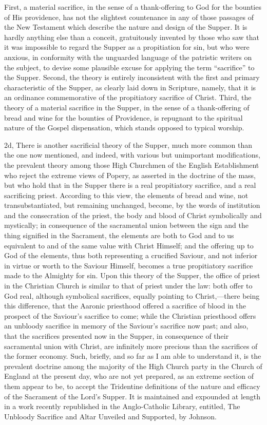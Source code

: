 \documentclass[]{book}
\begin{document}
First, a material sacrifice, in the sense of a thank-offering to God for the bounties of His providence, has not the slightest countenance in any of those passages of the New Testament which describe the nature and design of the Supper. It is hardly anything else than a conceit, gratuitously invented by those who saw that it was impossible to regard the Supper as a propitiation for sin, but who were anxious, in conformity with the unguarded language of the patristic writers on the subject, to devise some plausible excuse for applying the term ``sacrifice'' to the Supper. Second, the theory is entirely inconsistent with the first and primary characteristic of the Supper, as clearly laid down in Scripture, namely, that it is an ordinance commemorative of the propitiatory sacrifice of Christ. Third, the theory of a material sacrifice in the Supper, in the sense of a thank-offering of bread and wine for the bounties of Providence, is repugnant to the spiritual nature of the Gospel dispensation, which stands opposed to typical worship.

2d, There is another sacrificial theory of the Supper, much more common than the one now mentioned, and indeed, with various but unimportant modifications, the prevalent theory among those High Churchmen of the English Establishment who reject the extreme views of Popery, as asserted in the doctrine of the mass, but who hold that in the Supper there is a real propitiatory sacrifice, and a real sacrificing priest. According to this view, the elements of bread and wine, not transubstantiated, but remaining unchanged, become, by the words of institution and the consecration of the priest, the body and blood of Christ symbolically and mystically; in consequence of the sacramental union between the sign and the thing signified in the Sacrament, the elements are both to God and to us equivalent to and of the same value with Christ Himself; and the offering up to God of the elements, thus both representing a crucified Saviour, and not inferior in virtue or worth to the Saviour Himself, becomes a true propitiatory sacrifice made to the Almighty for sin. Upon this theory of the Supper, the office of priest in the Christian Church is similar to that of priest under the law: both offer to God real, although symbolical sacrifices, equally pointing to Christ,---there being this difference, that the Aaronic priesthood offered a sacrifice of blood in the prospect of the Saviour's sacrifice to come; while the Christian priesthood offers an unbloody sacrifice in memory of the Saviour's sacrifice now past; and also, that the sacrifices presented now in the Supper, in consequence of their sacramental union with Christ, are infinitely more precious than the sacrifices of the former economy. Such, briefly, and so far as I am able to understand it, is the prevalent doctrine among the majority of the High Church party in the Church of England at the present day, who are not yet prepared, as an extreme section of them appear to be, to accept the Tridentine definitions of the nature and efficacy of the Sacrament of the Lord's Supper. It is maintained and expounded at length in a work recently republished in the Anglo-Catholic Library, entitled, The Unbloody Sacrifice and Altar Unveiled and Supported, by Johnson.
\end{document}
